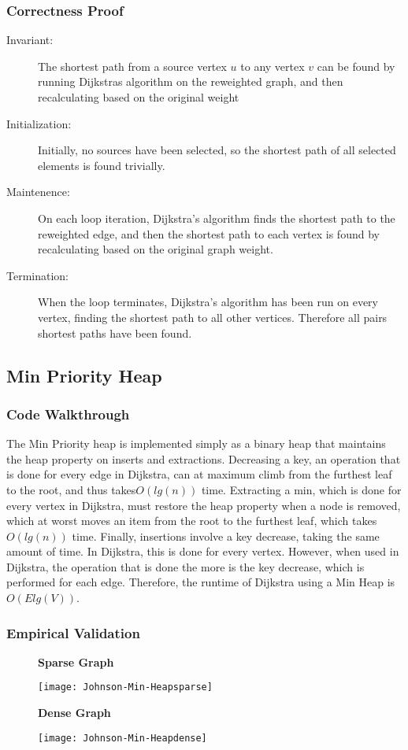 \documentclass[a4paper,12pt]{article}
\begin{document}
\subsubsection{Correctness Proof}
\begin{description}
\item [Invariant: ] The shortest path from a source vertex $u$ to any vertex $v$ can be found by running Dijkstras algorithm on the reweighted graph, and then recalculating based on the original weight
\item [Initialization: ] Initially, no sources have been selected, so the shortest path of all selected elements is found trivially.
\item [Maintenence: ] On each loop iteration, Dijkstra's algorithm finds the shortest path to the reweighted edge, and then the shortest path to each vertex is found by recalculating based on the original graph weight.
\item [Termination: ] When the loop terminates, Dijkstra's algorithm has been run on every vertex, finding the shortest path to all other vertices. Therefore all pairs shortest paths have been found.
\end{description}
\subsection{Min Priority Heap}
\subsubsection{Code Walkthrough}

The Min Priority heap is implemented simply as a binary heap that maintains the heap
property on inserts and extractions. Decreasing a key, an operation that is done for every edge in Dijkstra, can at maximum climb from the furthest leaf to the root, and thus takes$O(lg(n))$ time. Extracting a min, which is done for every vertex in Dijkstra, must restore the heap property when a node is removed, which at worst moves an item from the root to the furthest leaf, which takes $O(lg(n))$ time. Finally, insertions involve a key decrease, taking the same amount of time. In Dijkstra, this is done for every vertex. However, when used in Dijkstra, the operation that is done the more is the key decrease, which is performed for each edge. Therefore, the runtime of Dijkstra using a Min Heap is $O(Elg(V))$.
\subsubsection{Empirical Validation}
\begin{figure}[H]
  \centering
  \textbf{Sparse Graph}\par\medskip
  \texttt{[image: Johnson-Min-Heapsparse]}
\end{figure}
\begin{figure}[H]
  \centering
  \textbf{Dense Graph}\par\medskip
  \texttt{[image: Johnson-Min-Heapdense]}
\end{figure}
\end{document}
